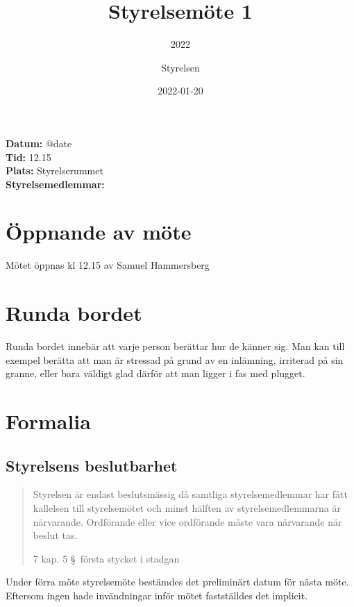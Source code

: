 \documentclass[protokoll]{dvd}
\begin{document}
\title{Styrelsemöte 1}
\subtitle{2022}
\author{Styrelsen}

\date{2022-01-20}

\textbf{Datum:} \csname @date\endcsname\\
\textbf{Tid:} 12.15\\
\textbf{Plats:} Styrelserummet\\
\textbf{Styrelsemedlemmar:}
\begin{närvarande_förtroendevalda}
\end{närvarande_förtroendevalda}


\section{Öppnande av möte}

Mötet öppnas kl 12.15 av Samuel Hammersberg

\section{Runda bordet}

    Runda bordet innebär att varje person berättar hur de känner sig.
    Man kan till exempel berätta att man är stressad på grund av en inlämning, irriterad på sin granne, eller bara väldigt glad därför att man ligger i fas med plugget.

\section{Formalia}

    \subsection{Styrelsens beslutbarhet}

        \blockquote[7 kap. 5 \S~första stycket i stadgan][]{
            Styrelsen är endast beslutsmässig då samtliga styrelsemedlemmar har fått kallelsen till styrelsemötet och minst hälften av styrelsemedlemmarna är närvarande.
            Ordförande eller vice ordförande måste vara närvarande när beslut tas.
        }

        Under förra möte styrelsemöte bestämdes det preliminärt datum för nästa möte. Eftersom ingen hade invändningar inför mötet fastställdes det implicit. 
\end{document}
